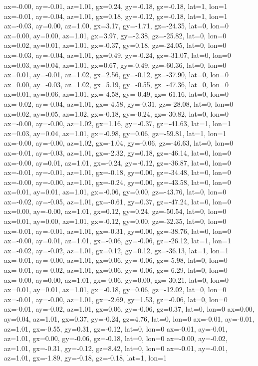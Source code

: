 ax=-0.00, ay=-0.01, az=1.01, gx=0.24, gy=-0.18, gz=-0.18, lat=1, lon=1
ax=-0.01, ay=-0.04, az=1.01, gx=0.18, gy=-0.12, gz=-0.18, lat=1, lon=1
ax=-0.03, ay=0.00, az=1.00, gx=3.17, gy=-1.71, gz=-24.35, lat=0, lon=0
ax=0.00, ay=0.00, az=1.01, gx=3.97, gy=-2.38, gz=-25.82, lat=0, lon=0
ax=0.02, ay=0.01, az=1.01, gx=-0.37, gy=0.18, gz=-24.05, lat=0, lon=0
ax=-0.03, ay=-0.04, az=1.01, gx=0.49, gy=-0.24, gz=-31.07, lat=0, lon=0
ax=0.03, ay=0.04, az=1.01, gx=0.67, gy=-0.49, gz=-60.36, lat=0, lon=0
ax=0.01, ay=-0.01, az=1.02, gx=2.56, gy=-0.12, gz=-37.90, lat=0, lon=0
ax=0.00, ay=-0.03, az=1.02, gx=5.19, gy=-0.55, gz=-47.36, lat=0, lon=0
ax=0.01, ay=0.06, az=1.01, gx=-4.58, gy=-0.49, gz=-61.16, lat=0, lon=0
ax=-0.02, ay=-0.04, az=1.01, gx=-4.58, gy=-0.31, gz=-28.08, lat=0, lon=0
ax=0.02, ay=0.05, az=1.02, gx=-0.18, gy=-0.24, gz=-30.82, lat=0, lon=0
ax=-0.00, ay=-0.00, az=1.02, gx=1.16, gy=-0.37, gz=-41.63, lat=1, lon=1
ax=0.03, ay=0.04, az=1.01, gx=-0.98, gy=0.06, gz=-59.81, lat=1, lon=1
ax=-0.00, ay=-0.00, az=1.02, gx=-1.04, gy=-0.06, gz=-46.63, lat=0, lon=0
ax=-0.01, ay=-0.03, az=1.01, gx=-2.32, gy=0.18, gz=-46.14, lat=0, lon=0
ax=-0.00, ay=0.01, az=1.01, gx=-0.24, gy=-0.12, gz=-36.87, lat=0, lon=0
ax=-0.01, ay=-0.01, az=1.01, gx=-0.18, gy=0.00, gz=-34.48, lat=0, lon=0
ax=-0.00, ay=-0.00, az=1.01, gx=-0.24, gy=0.00, gz=-43.58, lat=0, lon=0
ax=0.01, ay=0.01, az=1.01, gx=-0.06, gy=0.00, gz=-43.76, lat=0, lon=0
ax=-0.02, ay=-0.05, az=1.01, gx=-0.61, gy=0.37, gz=-47.24, lat=0, lon=0
ax=0.00, ay=-0.00, az=1.01, gx=0.12, gy=0.24, gz=-50.54, lat=0, lon=0
ax=0.01, ay=0.00, az=1.01, gx=-0.12, gy=0.00, gz=-32.35, lat=0, lon=0
ax=-0.01, ay=-0.01, az=1.01, gx=-0.31, gy=0.00, gz=-38.76, lat=0, lon=0
ax=-0.00, ay=0.01, az=1.01, gx=-0.06, gy=-0.06, gz=-26.12, lat=1, lon=1
ax=-0.02, ay=-0.02, az=1.01, gx=0.12, gy=0.12, gz=-36.13, lat=1, lon=1
ax=-0.01, ay=-0.00, az=1.01, gx=0.06, gy=-0.06, gz=-5.98, lat=0, lon=0
ax=-0.01, ay=-0.02, az=1.01, gx=0.06, gy=-0.06, gz=-6.29, lat=0, lon=0
ax=-0.00, ay=0.00, az=1.01, gx=-0.06, gy=0.00, gz=-30.21, lat=0, lon=0
ax=0.01, ay=0.01, az=1.01, gx=-0.18, gy=0.06, gz=-12.02, lat=0, lon=0
ax=-0.01, ay=-0.00, az=1.01, gx=-2.69, gy=1.53, gz=-0.06, lat=0, lon=0
ax=-0.01, ay=-0.02, az=1.01, gx=0.06, gy=-0.06, gz=0.37, lat=0, lon=0
ax=0.00, ay=0.04, az=1.01, gx=0.37, gy=-0.24, gz=4.76, lat=0, lon=0
ax=-0.01, ay=-0.01, az=1.01, gx=-0.55, gy=0.31, gz=-0.12, lat=0, lon=0
ax=-0.01, ay=-0.01, az=1.01, gx=0.00, gy=-0.06, gz=-0.18, lat=0, lon=0
ax=-0.00, ay=-0.02, az=1.01, gx=-0.31, gy=-0.12, gz=8.42, lat=0, lon=0
ax=-0.01, ay=-0.01, az=1.01, gx=-1.89, gy=-0.18, gz=-0.18, lat=1, lon=1
